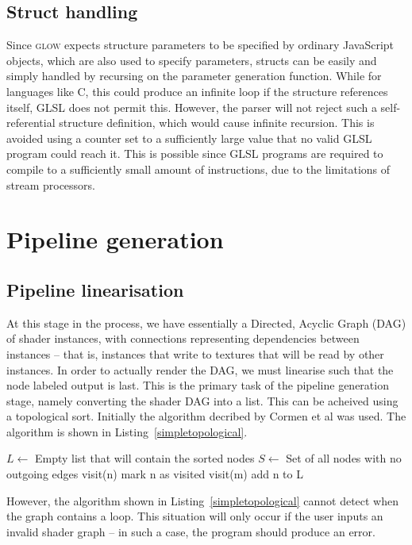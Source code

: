 \documentclass[12pt,twoside,notitlepage]{report}
\begin{document}
\subsection{Struct handling}
Since \textsc{glow} expects structure parameters to be specified by ordinary JavaScript objects, which are also used to specify parameters, structs can be easily and simply handled by recursing on the parameter generation function. While for languages like C, this could produce an infinite loop if the structure references itself, GLSL does not permit this. However, the parser will not reject such a self-referential structure definition, which would cause infinite recursion. This is avoided using a counter set to a sufficiently large value that no valid GLSL program could reach it. This is possible since GLSL programs are required to compile to a sufficiently small amount of instructions, due to the limitations of stream processors.

\section{Pipeline generation}
\subsection*{Pipeline linearisation}
At this stage in the process, we have essentially a Directed, Acyclic Graph (DAG) of shader instances, with connections representing dependencies between instances -- that is, instances that write to textures that will be read by other instances. In order to actually render the DAG, we must linearise such that the node labeled output is last. This is the primary task of the pipeline generation stage, namely converting the shader DAG into a list. This can be acheived using a topological sort. Initially the algorithm decribed by Cormen et al \cite{topsort} was used. The algorithm is shown in Listing~\ref{simpletopological}.
\begin{algorithm}
\label{simpletopological}
\begin{algorithmic}
\State $L \gets $ Empty list that will contain the sorted nodes
\State $S \gets $ Set of all nodes with no outgoing edges
    visit(n)
\EndFor 
{}
        mark n as visited
            visit(m)
        \EndFor
        add n to L
    \EndIf
\EndFunction
\end{algorithmic}
\end{algorithm}
However, the algorithm shown in Listing~\ref{simpletopological} cannot detect when the graph contains a loop. This situation will only occur if the user inputs an invalid shader graph -- in such a case, the program should produce an error.
\end{document}
